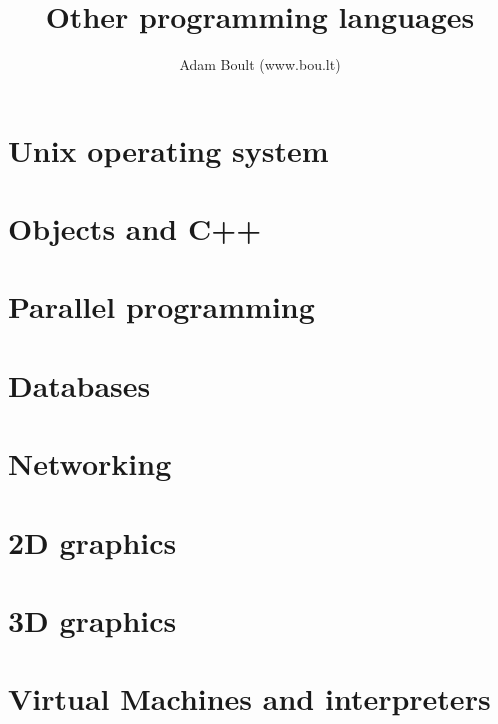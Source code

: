 \documentclass[oneside]{book}
\begin{document}
\author{Adam Boult (www.bou.lt)}
\title{Other programming languages}
\maketitle

\setcounter{tocdepth}{0}
\tableofcontents



\part{Unix operating system}


\part{Objects and C++}




\part{Parallel programming}


\part{Databases}





\part{Networking}

\part{2D graphics}






\part{3D graphics}







\part{Virtual Machines and interpreters}




\end{document}
